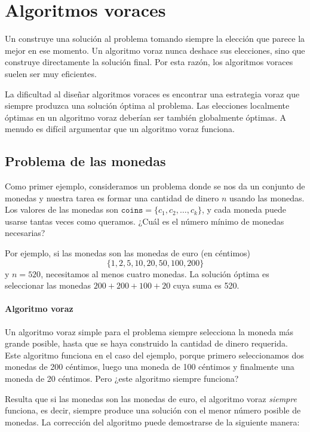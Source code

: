 \chapter{Algoritmos voraces}


Un 
construye una solución al problema
tomando siempre la elección que parece
la mejor en ese momento.
Un algoritmo voraz nunca deshace
sus elecciones, sino que construye directamente
la solución final.
Por esta razón, los algoritmos voraces
suelen ser muy eficientes.

La dificultad al diseñar algoritmos voraces
es encontrar una estrategia voraz
que siempre produzca una solución óptima
al problema.
Las elecciones localmente óptimas en un algoritmo
voraz deberían ser también globalmente óptimas.
A menudo es difícil argumentar que
un algoritmo voraz funciona.

\section{Problema de las monedas}

Como primer ejemplo, consideramos un problema
donde se nos da un conjunto de monedas
y nuestra tarea es formar una cantidad de dinero $n$
usando las monedas.
Los valores de las monedas son
$\texttt{coins}=\{c_1,c_2,\ldots,c_k\}$,
y cada moneda puede usarse tantas veces como queramos.
¿Cuál es el número mínimo de monedas necesarias?

Por ejemplo, si las monedas son las monedas de euro (en céntimos)
\[\{1,2,5,10,20,50,100,200\}\]
y $n=520$,
necesitamos al menos cuatro monedas.
La solución óptima es seleccionar las monedas
$200+200+100+20$ cuya suma es 520.

\subsubsection{Algoritmo voraz}

Un algoritmo voraz simple para el problema
siempre selecciona la moneda más grande posible,
hasta que se haya construido la cantidad de dinero requerida.
Este algoritmo funciona en el caso del ejemplo,
porque primero seleccionamos dos monedas de 200 céntimos,
luego una moneda de 100 céntimos y finalmente una moneda de 20 céntimos.
Pero ¿este algoritmo siempre funciona?

Resulta que si las monedas son las monedas de euro,
el algoritmo voraz \emph{siempre} funciona, es decir,
siempre produce una solución con el menor
número posible de monedas.
La corrección del algoritmo puede
demostrarse de la siguiente manera:

